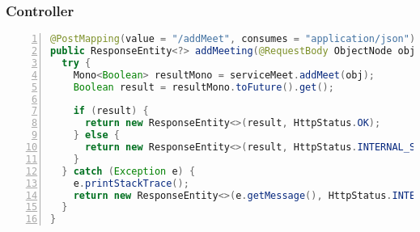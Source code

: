 \subsubsection{Controller}
\begin{lstlisting}[language=java, frame=lines, basicstyle=\ttfamily\scriptsize, numbers=left]
@PostMapping(value = "/addMeet", consumes = "application/json")
public ResponseEntity<?> addMeeting(@RequestBody ObjectNode obj) {
  try {
	Mono<Boolean> resultMono = serviceMeet.addMeet(obj);
	Boolean result = resultMono.toFuture().get();

	if (result) {
	  return new ResponseEntity<>(result, HttpStatus.OK);
	} else {
	  return new ResponseEntity<>(result, HttpStatus.INTERNAL_SERVER_ERROR);
	}
  } catch (Exception e) {
	e.printStackTrace();
	return new ResponseEntity<>(e.getMessage(), HttpStatus.INTERNAL_SERVER_ERROR);
  }
}    
\end{lstlisting}
